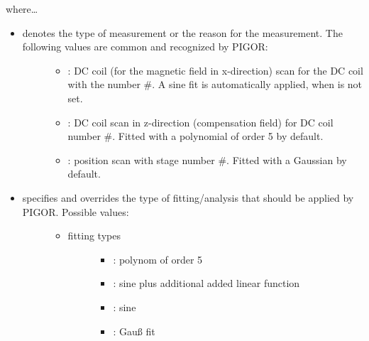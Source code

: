 \documentclass[letterpaper,10pt,english]{sphinxmanual}
\begin{document}
where…
\begin{itemize}
\item {} \begin{description}
\item[{ denotes the type of measurement or the reason for the measurement. The following values are common and recognized by PIGOR:}] \leavevmode\begin{itemize}
\item {} 
: DC coil (for the magnetic field in x-direction) scan for the DC coil with the number \#. A sine fit is automatically applied, when  is not set.

\item {} 
: DC coil scan in z-direction (compensation field) for DC coil number \#. Fitted with a polynomial of order 5 by default.

\item {} 
: position scan with stage number \#. Fitted with a Gaussian by default.

\end{itemize}

\end{description}

\item {} \begin{description}
\item[{ specifies and overrides the type of fitting/analysis that should be applied by PIGOR. Possible values:}] \leavevmode\begin{itemize}
\item {} \begin{description}
\item[{fitting types}] \leavevmode\begin{itemize}
\item {} 
: polynom of order 5

\item {} 
: sine plus additional added linear function

\item {} 
: sine

\item {} 
: Gauß fit

\end{itemize}


\end{description}
\end{itemize}
\end{description}
\end{itemize}
\end{document}
